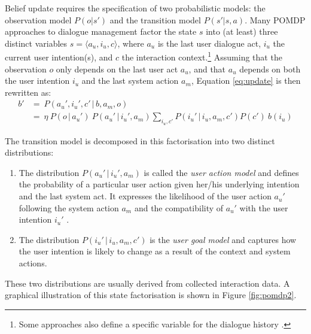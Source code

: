 Belief update requires the specification of two probabilistic models: the observation model $P(o|s')$ and the transition model $P(s'|s,a)$. Many POMDP approaches to dialogue management factor the state $s$ into (at least) three distinct variables $s = \langle a_u, i_u, c \rangle$, where $a_u$ is the last user dialogue act, $i_u$ the current user intention(s), and $c$ the interaction context.\footnote{Some approaches also define a specific variable for the dialogue history \citep{Young:2010}.}   Assuming that the observation $o$ only depends on the last user act $a_u$, and that $a_u$ depends on both the user intention $i_u$ and the last system action $a_m$, Equation \eqref{eq:update} is then rewritten as:
\begin{align}
b' & = \ P(a_u', i_u', c' \, | \, b, a_m,o)\\
& = \ \eta \ P(o \, | \, a_u') \ P(a_u' \, | \, i_u', a_m) \sum_{i_u, c'} P(i_u' \, | \, i_u,a_m, c') P(c') \ b(i_u) \label{eq:update2}
\end{align}

The transition model is decomposed in this factorisation into two distinct distributions: \begin{enumerate}
\item  The distribution $P(a_u' \, | \, i_u', a_m)$ is called the \textit{user action model} and defines the probability of a particular user action given her/his underlying intention and the last system act.  It expresses the likelihood of the user action $a_u'$ following the system action $a_m$ and the compatibility of $a_u'$ with the user intention $i_u'$ \citep{Young:2010}.
\item The distribution $P(i_u' \, | \, i_u, a_m, c')$ is the \textit{user goal model} and captures how the user intention is likely to change as a result of the context and system actions.  
\end{enumerate}

These two distributions are usually derived from collected interaction data. A graphical illustration of this state factorisation is shown in Figure \ref{fig:pomdp2}. 

